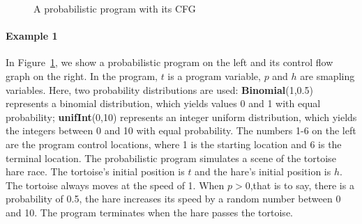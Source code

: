 \documentclass[runningheads]{llncs}
\begin{document}
\begin{figure}[htbp]
	\vspace{-0.5cm}  %
	\centering %
	\caption{A probabilistic program with its CFG} %
	\label{example1} %
\end{figure}

\paragraph{Example 1} In Figure~\ref{example1}, we show a probabilistic program on the left and its control flow graph on the right. In the program,  $t$ is a program variable,  $p$ and $h$ are smapling variables. Here, two probability distributions are used: \textbf{Binomial}(1,0.5) represents a binomial distribution, which yields values 0 and 1 with equal probability; \textbf{unifInt}(0,10) represents an integer uniform distribution, which yields the integers between 0 and 10  with equal probability. The numbers 1-6 on the left are the program control locations, where 1 is the starting location and 6 is the terminal location. The probabilistic program simulates a scene of the tortoise hare race. The tortoise's initial position is $t$ and the hare's initial position is $h$.  The tortoise  always moves at the speed of 1. When $p>0$,that is to say, there is a probability of 0.5, the hare increases its speed by a random number between 0 and 10. The program terminates when the hare passes the tortoise.
\end{document}
